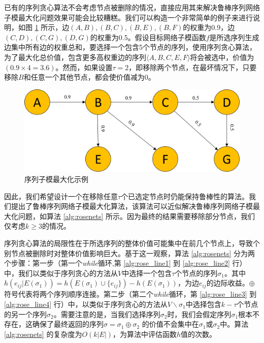 已有的序列贪心算法\cite{mitrovic2018submodularity}不会考虑节点被删除的情况，直接应用其来解决鲁棒序列网络子模最大化问题效果可能会比较糟糕。我们可以构造一个非常简单的例子来进行说明，如图 \ref{fig:rose_sample} 所示，边$(A,B),(B,C),(B,E),(B,F)$的权重为0.9，边$(C,D),(C,G),(D,G)$的权重为0.5。假设目标网络子模函数\(f\)是所选序列生成边集中所有边的权重总和，要选择一个包含5个节点的序列，使用序列贪心算法，为了最大化总价值，包含更多高权重边的序列\(\langle A,B,C,E,F \rangle\)将会被选中，价值为\((0.9 \times 4 = 3.6)\)。然而，如果设置\(\tau=2\)，即移除两个节点，在最坏情况下，只要移除\(B\)和任意一个其他节点，都会使价值减为$0$。

\begin{figure}[th]
    \centering
    \includegraphics[width=.89\linewidth]{figure/rosenets/sample2}
    \caption{序列子模最大化示例}
    \label{fig:rose_sample}
\end{figure}

因此，我们希望设计一个在移除任意$\tau$个已选定节点时仍能保持鲁棒性的算法。我们提出了鲁棒序列网络子模最大化算法，该算法可以近似解决鲁棒序列网络子模最大化问题，如算法 \ref{alg:rosenets} 所示。因为最终的结果需要移除部分节点，我们仅考虑$k \ge 3$的情况。

序列贪心算法的局限性在于所选序列的整体价值可能集中在前几个节点上，导致个别节点被删除时对整体价值影响巨大。基于这一观察，算法 \ref{alg:rosenets} 分为两个步骤：第一步（第一个\textit{while}循环,第 \ref{alg:rose_line1} 到 \ref{alg:rose_line2} 行）中，我们以类似于序列贪心的方法从\(V\)中选择一个包含\(\tau\)个节点的序列\(\sigma_1\)。其中$h(e_{ij}|E(\sigma_1))=h(E(\sigma_1)\cup\{e_{ij}\})-h(E(\sigma_1))$，为边$e_{ij}$的边际收益。$\oplus$符号代表将两个序列顺序连接。第二步（第二个\textit{while}循环，第 \ref{alg:rose_line3} 到 \ref{alg:rose_line4} 行）中，以类似于序列贪心的方法从\(V\backslash \sigma_1\)中选择包含\(k-\tau\)个节点的另一个序列\(\sigma_2\)。需要注意的是，当我们选择序列\(\sigma_2\)时，我们会假定序列\(\sigma_1\)根本不存在，这确保了最终返回的序列\(\sigma = \sigma_1 \oplus \sigma_2\) 的价值不会集中在\(\sigma_1\)或\(\sigma_2\)中。算法 \ref{alg:rosenets} 的复杂度为\(O(k|E|)\)，为算法中评估函数$h$值的次数。

